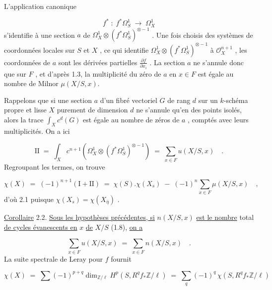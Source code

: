 
L'application canonique

\begin{equation*}
f^* \; : \; f^*\Omega^1_S \; \longrightarrow \; \Omega^1_X
\end{equation*}
s'identifie à une section $a$ de $\Omega^1_X \otimes (f^*\Omega^1_S)^{\otimes -1}$ . Une fois choisis des systèmes de coordonnées locales sur $S$ et $X$ , ce qui identifie $\Omega^1_X \otimes (f^*\Omega^1_S)^{\otimes -1}$ à $\mathcal{O}_X^{n+1}$ , les coordonnées de $a$ sont les dérivées partielles $\frac{\partial f}{\partial x_i}$ . La section $a$ ne s'annule donc que sur $F$ , et d'après 1.3, la multiplicité du zéro de $a$ en $x \in F$ est égale au nombre de Milnor $\mu(X/S,x)$.

Rappelons que si une section $a$ d'un fibré vectoriel $G$ de rang $d$ sur un $k$-schéma propre et lisse $X$ purement de dimension $d$ ne s'annule qu'en des points isolés, alors la trace $\int_X c^d(G)$ est égale au nombre de zéros de $a$ , comptés avec leurs multiplicités. On a ici

\begin{equation*}
\mathrm{II} \; = \; \int_X c^{n+1}(\Omega^1_X \otimes (f^*\Omega^1_S)^{\otimes -1}) \; = \; \sum_{x \in F} u(X/S,x) \quad .
\end{equation*}
Regroupant les termes, on trouve

\begin{equation*}
\chi(X) \; = \; (-1)^{n+1}(\mathrm{I} + \mathrm{II}) \; = \; \chi(S).\chi(X_s) \; - \; (-1)^n \sum_{x \in F} \mu(X/S,x) \quad ,
\end{equation*}
d'où 2.1 puisque $\chi(X_s) = \chi(X_{\bar{\eta}})$ .

\underline{Corollaire} 2.2. \quad \underline{Sous les hypothèses précédentes, si} $n(X/S,x)$ \underline{est le nombre} total \underline{de cycles évanescents en} $x$ \underline{de} $X/S$ (1.8), \underline{on a}

\begin{equation*}
\sum_{x \in F} u(X/S,x) \; = \; \sum_{x \in F} n(X/S,x) \quad .
\end{equation*}
La suite spectrale de Leray pour $f$ fournit

\begin{equation*}
\chi(X) \; = \; \sum (-1)^{p+q} \dim_{\mathbb{Z}/\ell} H^p(S,R^q f_* \mathbb{Z}/\ell) \; = \; \sum_q (-1)^q \, \chi(S,R^q f_* \mathbb{Z}/\ell)
\end{equation*}

